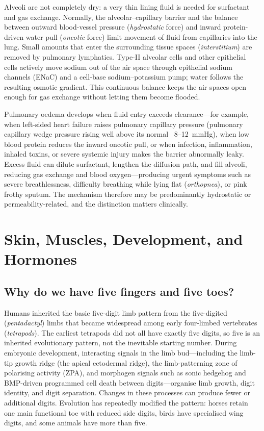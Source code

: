\documentclass[11pt,oneside]{report}
\begin{document}
Alveoli are not completely dry: a very thin lining fluid is needed for
surfactant and gas exchange. Normally, the alveolar--capillary barrier and the balance between outward
blood-vessel pressure (\emph{hydrostatic} force) and inward protein-driven
water pull (\emph{oncotic} force) limit movement of fluid from capillaries into
the lung. Small amounts that enter the surrounding tissue spaces
(\emph{interstitium}) are removed by pulmonary lymphatics. Type-II alveolar
cells and other epithelial cells actively move sodium out of the air space
through epithelial sodium channels (ENaC) and a cell-base sodium--potassium
pump; water follows the resulting osmotic gradient. This continuous balance
keeps the air spaces open enough for gas exchange without letting them become
flooded.

Pulmonary oedema develops when fluid entry exceeds clearance---for example,
when left-sided heart failure raises pulmonary capillary pressure (pulmonary
capillary wedge pressure rising well above its normal ~8--12~mmHg), when low
blood protein reduces the inward oncotic pull, or when infection,
inflammation, inhaled toxins, or severe systemic injury makes the barrier
abnormally leaky. Excess fluid can dilute surfactant, lengthen the diffusion
path, and fill alveoli, reducing gas exchange and blood oxygen—producing urgent
symptoms such as severe breathlessness, difficulty breathing while lying flat
(\emph{orthopnea}), or pink frothy sputum. The mechanism
therefore may be predominantly hydrostatic or permeability-related, and the
distinction matters clinically.

\chapter{Skin, Muscles, Development, and Hormones}

\section{Why do we have five fingers and five toes?}

Humans inherited the basic five-digit limb pattern from the five-digited
(\emph{pentadactyl}) limbs that became widespread among early four-limbed
vertebrates (\emph{tetrapods}). The earliest tetrapods did not
all have exactly five digits, so five is an inherited evolutionary pattern, not
the inevitable starting number. During embryonic development, interacting
signals in the limb bud---including the limb-tip growth ridge (the apical
ectodermal ridge), the limb-patterning zone of polarising activity (ZPA), and
morphogen signals such as sonic hedgehog and BMP-driven programmed cell death
between digits—organise limb growth, digit identity, and digit separation.
Changes in these processes can produce fewer or additional digits. Evolution
has repeatedly modified the pattern: horses retain one main functional toe with
reduced side digits, birds have specialised wing digits, and some animals have
more than five.
\end{document}
